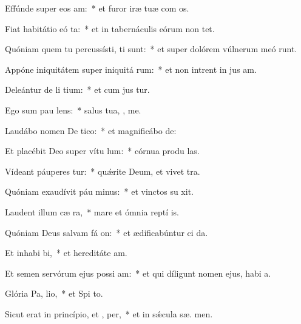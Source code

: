 \item Effúnde super eos  am:~* et furor iræ tuæ com os.
\item Fiat habitátio eó ta:~* et in tabernáculis eórum non   tet.
\item Quóniam quem tu percussísti, ti sunt:~* et super dolórem vúlnerum meó runt.
\item Appóne iniquitátem super iniquitá rum:~* et non intrent in jus am.
\item Deleántur de li tium:~* et cum jus  tur.
\item Ego sum pau  lens:~* salus tua, ,  me.
\item Laudábo nomen De  tico:~* et magnificábo   de:
\item Et placébit Deo super vítu lum:~* córnua produ  las.
\item Vídeant páuperes  tur:~* quǽrite Deum, et vivet  tra.
\item Quóniam exaudívit páu minus:~* et vinctos su  xit.
\item Laudent illum cæ  ra,~* mare et ómnia reptí  is.
\item Quóniam Deus salvam fá on:~* et ædificabúntur ci da.
\item Et inhabi bi,~* et hereditáte  am.
\item Et semen servórum ejus possi am:~* et qui díligunt nomen ejus, habi  a.
\item Glória Pa,  lio,~* et Spi to.
\item Sicut erat in princípio, et ,  per,~* et in sǽcula sæ. men.

